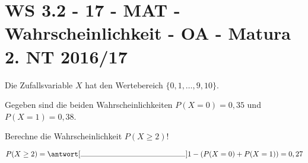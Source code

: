 \section{WS 3.2 - 17 - MAT - Wahrscheinlichkeit - OA - Matura 2. NT 2016/17}

\begin{beispiel}[WS 3.2]{1} %
Die Zufallsvariable $X$ hat den Wertebereich $\{0, 1, \ldots, 9, 10\}$.

Gegeben sind die beiden Wahrscheinlichkeiten $P(X=0)=0,35$ und\\ 
\mbox{$P(X=1)=0,38$}.\leer

Berechne die Wahrscheinlichkeit $P(X\geq 2)$!\leer

$P(X\geq 2)=\antwort[\rule{5cm}{0.3pt}]{1-(P(X=0)+P(X=1))=0,27}$
\end{beispiel}